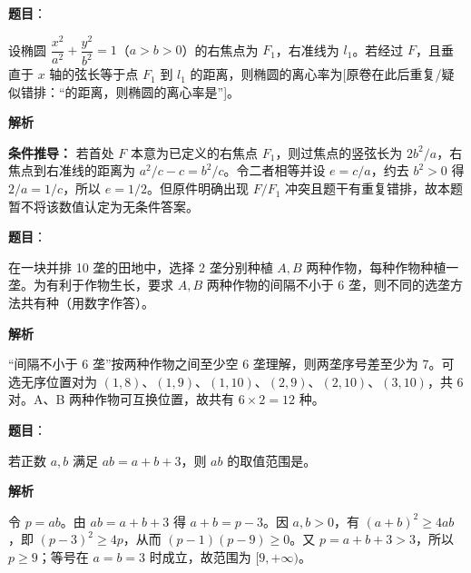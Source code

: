 \begin{answer}

\textbf{题目}：

设椭圆 $\dfrac{x^2}{a^2}+\dfrac{y^2}{b^2}=1$（$a>b>0$）的右焦点为 $F_1$，右准线为 $l_1$。若经过 $F$，且垂直于 $x$ 轴的弦长等于点 $F_1$ 到 $l_1$ 的距离，则椭圆的离心率为[原卷在此后重复/疑似错排：“的距离，则椭圆的离心率是”]\gkblank{}。

\textbf{解析}

\textbf{条件推导：} 若首处 $F$ 本意为已定义的右焦点 $F_1$，则过焦点的竖弦长为 $2b^2/a$，右焦点到右准线的距离为 $a^2/c-c=b^2/c$。令二者相等并设 $e=c/a$，约去 $b^2>0$ 得 $2/a=1/c$，所以 $e=1/2$。但原件明确出现 $F/F_1$ 冲突且题干有重复错排，故本题暂不将该数值认定为无条件答案。


\end{answer}
\begin{answer}

\textbf{题目}：

在一块并排 10 垄的田地中，选择 2 垄分别种植 $A,B$ 两种作物，每种作物种植一垄。为有利于作物生长，要求 $A,B$ 两种作物的间隔不小于 6 垄，则不同的选垄方法共有\gkblank{}种（用数字作答）。

\textbf{解析}

“间隔不小于 6 垄”按两种作物之间至少空 6 垄理解，则两垄序号差至少为 7。可选无序位置对为 $(1,8)$、$(1,9)$、$(1,10)$、$(2,9)$、$(2,10)$、$(3,10)$，共 6 对。A、B 两种作物可互换位置，故共有 $6\times2=12$ 种。


\end{answer}
\begin{answer}

\textbf{题目}：

若正数 $a,b$ 满足 $ab=a+b+3$，则 $ab$ 的取值范围是\gkblank{}。

\textbf{解析}

令 $p=ab$。由 $ab=a+b+3$ 得 $a+b=p-3$。因 $a,b>0$，有 $(a+b)^2\ge4ab$，即 $(p-3)^2\ge4p$，从而 $(p-1)(p-9)\ge0$。又 $p=a+b+3>3$，所以 $p\ge9$；等号在 $a=b=3$ 时成立，故范围为 $[9,+\infty)$。

\gkanswer{答案：$[9,+\infty)$。}

\end{answer}
